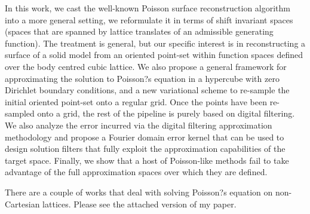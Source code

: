In this work, we cast the well-known Poisson surface reconstruction algorithm into a more general setting, we reformulate it in terms of shift invariant spaces (spaces that are spanned by lattice translates of an admissible generating function). The treatment is general, but our specific interest is in reconstructing a surface of a solid model from an oriented point-set within function spaces defined over the body centred cubic lattice. We also propose a general framework for approximating the solution to Poisson?s equation in a hypercube with zero Dirichlet boundary conditions, and a new variational scheme to re-sample the initial oriented point-set onto a regular grid. Once the points have been re-sampled onto a grid, the rest of the pipeline is purely based on digital filtering. We also analyze the error incurred via the digital filtering approximation methodology and propose a Fourier domain error kernel that can be used to design solution filters that fully exploit the approximation capabilities of the target space. Finally, we show that a host of Poisson-like methods fail to take advantage of the full approximation spaces over which they are defined.







There are a couple of works that deal with solving Poisson?s equation on non-Cartesian lattices. Please see the attached version of my paper.

